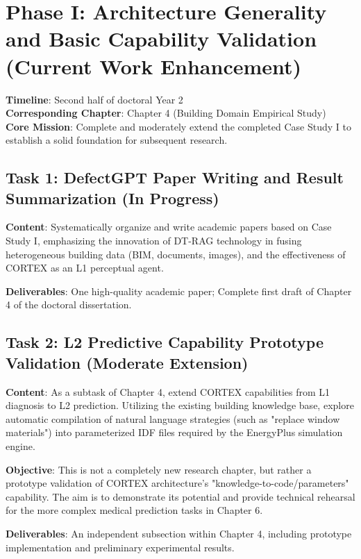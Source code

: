 \section{Phase I: Architecture Generality and Basic Capability Validation (Current Work Enhancement)}

\textbf{Timeline}: Second half of doctoral Year 2\\
\textbf{Corresponding Chapter}: Chapter 4 (Building Domain Empirical Study)\\
\textbf{Core Mission}: Complete and moderately extend the completed Case Study I to establish a solid foundation for subsequent research.

\subsection{Task 1: DefectGPT Paper Writing and Result Summarization (In Progress)}

\textbf{Content}: Systematically organize and write academic papers based on Case Study I, emphasizing the innovation of DT-RAG technology in fusing heterogeneous building data (BIM, documents, images), and the effectiveness of CORTEX as an L1 perceptual agent.

\textbf{Deliverables}: One high-quality academic paper; Complete first draft of Chapter 4 of the doctoral dissertation.

\subsection{Task 2: L2 Predictive Capability Prototype Validation (Moderate Extension)}

\textbf{Content}: As a subtask of Chapter 4, extend CORTEX capabilities from L1 diagnosis to L2 prediction. Utilizing the existing building knowledge base, explore automatic compilation of natural language strategies (such as "replace window materials") into parameterized IDF files required by the EnergyPlus simulation engine.

\textbf{Objective}: This is not a completely new research chapter, but rather a prototype validation of CORTEX architecture's "knowledge-to-code/parameters" capability. The aim is to demonstrate its potential and provide technical rehearsal for the more complex medical prediction tasks in Chapter 6.

\textbf{Deliverables}: An independent subsection within Chapter 4, including prototype implementation and preliminary experimental results.

